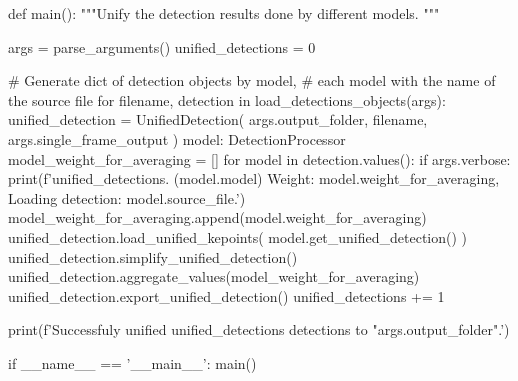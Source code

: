 \startPY
def main():
    """Unify the detection results done by different models.
    """

    args = parse_arguments()
    unified_detections = 0

    # Generate dict of detection objects by model, 
    # each model with the name of the source file
    for filename, detection in load_detections_objects(args):
        unified_detection = UnifiedDetection(
            args.output_folder,
            filename,
            args.single_frame_output
        )
        model: DetectionProcessor
        model_weight_for_averaging = []
        for model in detection.values():
            if args.verbose:
                print(f'{unified_detections}. ({model.model}) 
                Weight: {model.weight_for_averaging}, 
                Loading detection: {model.source_file}.')
            model_weight_for_averaging.append(model.weight_for_averaging)
            unified_detection.load_unified_kepoints(
                model.get_unified_detection()
            )
        unified_detection.simplify_unified_detection()
        unified_detection.aggregate_values(model_weight_for_averaging)
        unified_detection.export_unified_detection()
        unified_detections += 1


    print(f'Successfuly unified {unified_detections} detections
    to "{args.output_folder}".')

if __name__ == '__main__':
    main()
\stopPY
\stopbuffer

